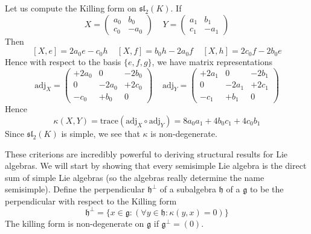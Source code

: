 \begin{example}
    Let us compute the Killing form on $\mathfrak{sl}_2(K)$. If
    \[ X = \begin{pmatrix} a_0 & b_0 \\ c_0 & -a_0 \end{pmatrix}\ \ \ \ \ Y = \begin{pmatrix} a_1 & b_1 \\ c_1 & -a_1 \end{pmatrix} \]
    Then
    \[ [X,e] = 2 a_0 e - c_0 h\ \ \ \ \ [X,f] = b_0 h - 2 a_0 f\ \ \ \ \ [X,h] = 2 c_0 f - 2 b_0 e \]
    Hence with respect to the basis $\{ e,f,g \}$, we have matrix representations
    \[ \text{adj}_X = \begin{pmatrix} +2a_0 & 0 & -2b_0 \\ 0 & - 2a_0 & +2c_0 \\ -c_0 & +b_0 & 0 \end{pmatrix}\ \ \ \ \ \text{adj}_Y = \begin{pmatrix} +2a_1 & 0 & -2b_1 \\ 0 & - 2a_1 & +2c_1 \\ -c_1 & +b_1 & 0 \end{pmatrix} \]
    Hence
    \[ \kappa(X,Y) = \text{trace}(\text{adj}_X \circ \text{adj}_Y) = 8a_0a_1 + 4b_0c_1 + 4c_0b_1 \]
    Since $\mathfrak{sl}_2(K)$ is simple, we see that $\kappa$ is non-degenerate.
\end{example}

These criterions are incredibly powerful to deriving structural results for Lie algebras. We will start by showing that every semisimple Lie algebra is the direct sum of simple Lie algebras (so the algebras really determine the name semisimple). Define the perpendicular $\mathfrak{h}^\perp$ of a subalgebra $\mathfrak{h}$ of a $\mathfrak{g}$ to be the perpendicular with respect to the Killing form
%
\[ \mathfrak{h}^\perp = \{ x \in \mathfrak{g} : (\forall y \in \mathfrak{h}: \kappa(y,x) = 0) \} \]
%
The killing form is non-degenerate on $\mathfrak{g}$ if $\mathfrak{g}^\perp = (0)$.

